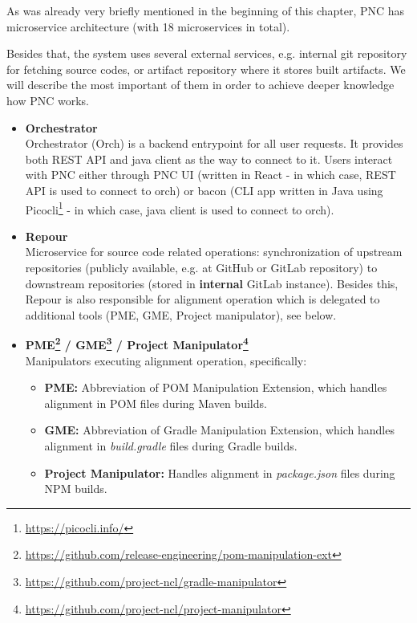 \documentclass[../main.tex]{subfiles}
\begin{document}
As was already very briefly mentioned in the beginning of this chapter, PNC has microservice architecture (with 18 microservices in total).

Besides that, the system uses several external services, e.g. internal git repository for fetching source codes, or artifact repository where it stores built artifacts. We will describe the most important of them in order to achieve deeper knowledge how PNC works.

\begin{itemize}
    \item \textbf{Orchestrator}\\
    Orchestrator (Orch) is a backend entrypoint for all user requests. It provides both REST API and java client as the way to connect to it. Users interact with PNC either through PNC UI (written in React - in which case, REST API is used to connect to orch) or bacon (CLI app written in Java using Picocli\footnote{\url{https://picocli.info/}} - in which case, java client is used to connect to orch).

    \item \textbf{Repour}\\
    Microservice for source code related operations: synchronization of upstream repositories (publicly available, e.g. at GitHub or GitLab repository) to downstream repositories (stored in \textbf{internal} GitLab instance). Besides this, Repour is also responsible for alignment operation which is delegated to additional tools (PME, GME, Project manipulator), see below.

    \item \textbf{PME\footnote{\url{https://github.com/release-engineering/pom-manipulation-ext}} / GME\footnote{\url{https://github.com/project-ncl/gradle-manipulator}} / Project Manipulator\footnote{\url{https://github.com/project-ncl/project-manipulator}}}\\
    Manipulators executing alignment operation, specifically:
    \begin{itemize}
        \item \textbf{PME:} Abbreviation of POM Manipulation Extension, which handles alignment in POM files during Maven builds.

        \item \textbf{GME:} Abbreviation of Gradle Manipulation Extension, which handles alignment in \textit{build.gradle} files during Gradle builds.

        \item \textbf{Project Manipulator:} Handles alignment in \textit{package.json} files during NPM builds.
    \end{itemize}


\end{itemize}
\end{document}
